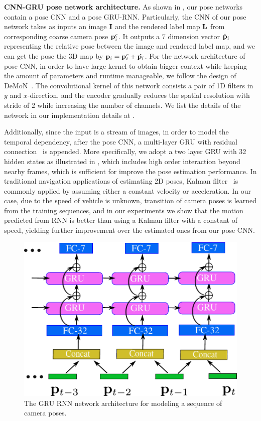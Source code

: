 \textbf{CNN-GRU pose network architecture.}
As shown in , our pose networks contain a pose CNN and a pose GRU-RNN. Particularly,
the CNN of our pose network takes as inputs an image ${\mathbf I}$ and the rendered label map ${\mathbf L}$ from corresponding coarse camera pose ${\mathbf p}_i^c$. It outputs a 7 dimension vector $\hat{{\mathbf p}}_i$ representing the relative pose between the image and rendered label map, and we can get the pose \wrt the 3D map by ${\mathbf p}_i = {\mathbf p}_i^c + \hat{{\mathbf p}_i}$.
For the network architecture of pose CNN, in order to have large kernel to obtain bigger context while keeping the amount of parameters and runtime manageable, we follow the design of DeMoN~\cite{ummenhofer2016demon}. The convolutional kernel of this network consists a pair of 1D filters in $y$ and $x$-direction, and the encoder gradually reduces the spatial resolution with stride of 2 while increasing the number of channels. We list the details of the network in our implementation details at .

Additionally, since the input is a stream of images, in order to model the temporal dependency,
after the pose CNN, a multi-layer GRU with residual connection~\cite{wu2016google} is appended.
More specifically, we adopt a two layer GRU with 32 hidden states as illustrated in , which includes high order interaction beyond nearby frames, which is sufficient for improve the pose estimation performance.
In traditional navigation applications of estimating 2D poses,  Kalman filter~\cite{kalman1960new} is commonly applied by assuming either a constant velocity or acceleration.
In our case, due to the speed of vehicle is unknown, transition of camera poses is learned from the training sequences, and in our experiments we show that the motion predicted from RNN is better than using a Kalman filter with a constant of speed, yielding further improvement over the estimated ones from our pose CNN.

\begin{figure}[t]
\begin{center}
\includegraphics[width=\linewidth]{fig/RNN.pdf}
\end{center}
   \caption{The GRU RNN network architecture for modeling a sequence of camera poses.}
\label{fig:rnn}
\end{figure}

